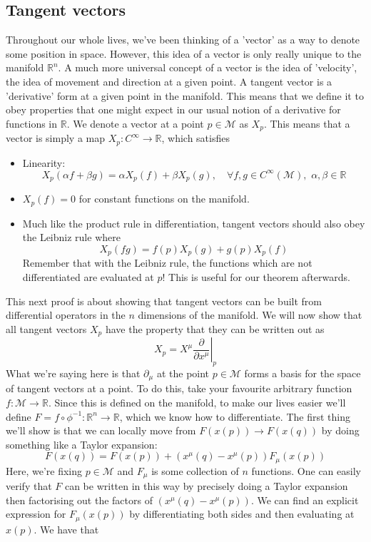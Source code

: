 \documentclass[11pt, a4paper]{article}   	%
\theoremstyle{slplain}
\begin{document}
\subsection{Tangent vectors}
Throughout our whole lives, we've been thinking of a 'vector' as a way to denote some position in space. However, this idea of a vector is only really unique to the manifold $\mathbb{R} ^n $. A much more universal concept of a vector is the idea of 'velocity', the idea of movement and direction at a given point.  A tangent vector is a 'derivative' form at a given point in the manifold. This means that we define it to obey properties that one might expect in our usual notion of a derivative for functions in $\mathbb{R}$. We denote a vector at a point $ p \in \mathcal{M}$ as $X_p$. 
This means that a vector is simply a map $X_p : C^\infty \rightarrow \mathbb{R} $, which satisfies  
\begin{itemize} 
\item Linearity: 
\[ X_p( \alpha f + \beta g ) = \alpha X_p ( f) + \beta X_p (g), \quad \forall f, g \in C^\infty (\mathcal M ), \, \, \alpha, \beta \in \mathbb{R} \]
\item  $X_p( f)  = 0$ for constant functions on the manifold.
\item Much like the product rule in differentiation, tangent vectors should also obey the Leibniz rule where 
\[ 
X_p(fg) = f(p ) X_p (g) + g(p) X_p (f) 
\] 
Remember that with the Leibniz rule, the functions which are not differentiated are evaluated at $p$! This is useful for our theorem afterwards.  
\end{itemize} 
This next proof is about showing that tangent vectors can be built from differential operators in the $n$ dimensions of the manifold. 
We will now show that all tangent vectors $X_p$ have the property that they can be written out as 
\[ 
X_p = X^\mu  \left. \frac{ \partial }{ \partial x^\mu } \right\vert_{p} 
\] What we're saying here is that $ \partial_\mu $ at the point $p \in \mathcal{M} $ forms a basis for the space of tangent vectors at a point. 
To do this, take your favourite arbitrary function $f: \mathcal{ M} \rightarrow \mathbb{R} $. Since this is defined on the manifold, to make our lives easier we'll define $F = f \circ \phi^{ -1}: \mathbb{R}^n \rightarrow \mathbb{R} $, which we know how to differentiate. The first thing we'll show is that we can locally move from $F(x(p)) \rightarrow F(x(q)) $ by doing something like a Taylor expansion: 
\[ 
F( x(q)) = F(x(p))    + ( x^\mu (q)  - x^\mu (p) ) F_\mu ( x( p)) 
\] 
Here, we're fixing $p \in \mathcal{ M} $ and $F_\mu$ is some collection of $n$ functions. One can easily verify that $F$ can be written in this way by precisely doing a Taylor expansion then factorising out the factors of $(x^\mu (q)  - x^\mu (p) )$. We can find an explicit expression for $F_\mu ( x(p ))$ by differentiating both sides and then evaluating at $x( p)$. We have that 
\end{document}

